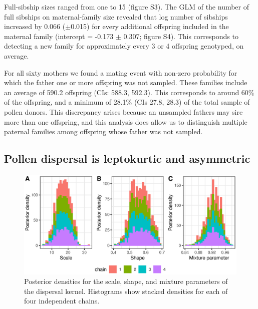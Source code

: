 \documentclass[10pt, a4paper, twocolumn]{article} %
\begin{document}
Full-sibship sizes ranged from one to 15 (figure S3).
The GLM of the number of full sibships on maternal-family size revealed that log number of sibships increased by 0.066 ($\pm$0.015) for every additional offspring included in the maternal family (intercept = -0.173 $\pm$ 0.307; figure S4). This corresponds to detecting a new family for approximately every 3 or 4 offspring genotyped, on average.

For all sixty mothers we found a mating event with non-zero probability for which the father one or more offspring was not sampled.
These families include an average of 590.2 offspring (CIs: 588.3, 592.3).
This corresponds to around 60\% of the offspring, and a minimum of 28.1\% (CIs 27.8, 28.3) of the total sample of pollen donors.
This discrepancy arises because an unsampled fathers may sire more than one offspring, and this analysis does allow us to distinguish multiple paternal families among offspring whose father was not sampled.

\subsection{Pollen dispersal is leptokurtic and asymmetric}

\begin{figure}
    \centering
    \includegraphics{posterior_distributions.eps}
    \caption{
        Posterior densities for the scale, shape, and mixture parameters of the dispersal kernel.
        Histograms show stacked densities for each of four independent chains.
    }
    \label{fig:posterior_summaries}
\end{figure}
\end{document}
